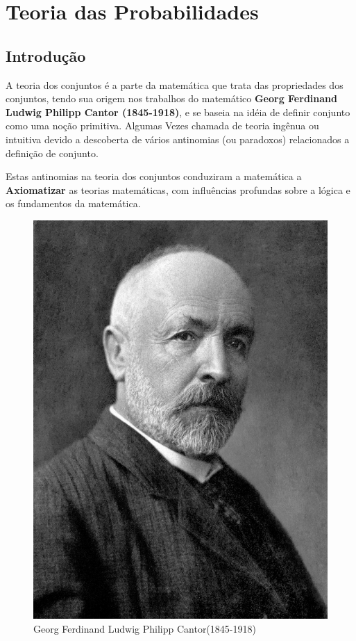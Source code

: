\chapter{Teoria das Probabilidades}
\section{Introdução}

\inic A teoria dos conjuntos é a parte da matemática que trata das propriedades dos conjuntos, tendo sua origem nos trabalhos do matemático \textbf{Georg Ferdinand Ludwig Philipp Cantor (1845-1918)}, e se baseia na idéia de definir conjunto como uma noção primitiva. Algumas Vezes chamada de teoria ingênua ou intuitiva devido a descoberta de vários antinomias (ou paradoxos) relacionados a definição de conjunto.\vskip0.3cm

\inic Estas antinomias na teoria dos conjuntos conduziram a matemática a \textbf{Axiomatizar} as teorias  matemáticas, com influências profundas sobre a lógica e os fundamentos da matemática.


\begin{figure}
    \centering
    \includegraphics[scale=0.1]{figures/Cantor1.jpeg}
    \caption{Georg Ferdinand
Ludwig Philipp Cantor(1845-1918)}
    \label{fig:my_label}
\end{figure}



